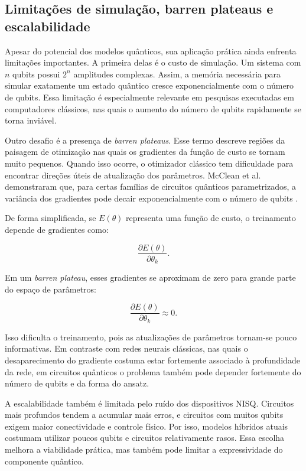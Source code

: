 \documentclass[
    12pt,
    openright,
    oneside,
    a4paper,
    english,
    brazil
]{abntex2}
\begin{document}
\subsection{Limitações de simulação, barren plateaus e escalabilidade}

Apesar do potencial dos modelos quânticos, sua aplicação prática ainda enfrenta limitações importantes. A primeira delas é o custo de simulação. Um sistema com \(n\) qubits possui \(2^n\) amplitudes complexas. Assim, a memória necessária para simular exatamente um estado quântico cresce exponencialmente com o número de qubits. Essa limitação é especialmente relevante em pesquisas executadas em computadores clássicos, nas quais o aumento do número de qubits rapidamente se torna inviável.

Outro desafio é a presença de \textit{barren plateaus}. Esse termo descreve regiões da paisagem de otimização nas quais os gradientes da função de custo se tornam muito pequenos. Quando isso ocorre, o otimizador clássico tem dificuldade para encontrar direções úteis de atualização dos parâmetros. McClean et al. demonstraram que, para certas famílias de circuitos quânticos parametrizados, a variância dos gradientes pode decair exponencialmente com o número de qubits \cite{mcclean2018barren}.

De forma simplificada, se \(E(\theta)\) representa uma função de custo, o treinamento depende de gradientes como:

\[
\frac{\partial E(\theta)}{\partial \theta_k}.
\]

Em um \textit{barren plateau}, esses gradientes se aproximam de zero para grande parte do espaço de parâmetros:

\[
\frac{\partial E(\theta)}{\partial \theta_k}
\approx 0.
\]

Isso dificulta o treinamento, pois as atualizações de parâmetros tornam-se pouco informativas. Em contraste com redes neurais clássicas, nas quais o desaparecimento do gradiente costuma estar fortemente associado à profundidade da rede, em circuitos quânticos o problema também pode depender fortemente do número de qubits e da forma do ansatz.

A escalabilidade também é limitada pelo ruído dos dispositivos NISQ. Circuitos mais profundos tendem a acumular mais erros, e circuitos com muitos qubits exigem maior conectividade e controle físico. Por isso, modelos híbridos atuais costumam utilizar poucos qubits e circuitos relativamente rasos. Essa escolha melhora a viabilidade prática, mas também pode limitar a expressividade do componente quântico.
\end{document}
